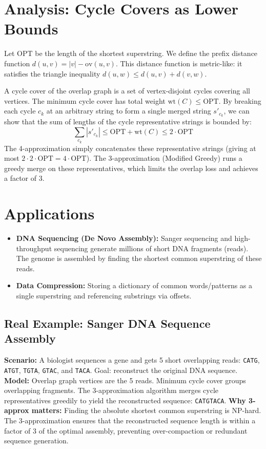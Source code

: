 \documentclass[11pt,oneside]{book}
\begin{document}
\section{Analysis: Cycle Covers as Lower Bounds}
Let $\text{OPT}$ be the length of the shortest superstring. We define the prefix distance function $d(u, v) = |v| - \text{ov}(u, v)$. This distance function is metric-like: it satisfies the triangle inequality $d(u, w) \le d(u, v) + d(v, w)$.

A cycle cover of the overlap graph is a set of vertex-disjoint cycles covering all vertices. The minimum cycle cover has total weight $\text{wt}(C) \le \text{OPT}$. By breaking each cycle $c_k$ at an arbitrary string to form a single merged string $s'_{c_k}$, we can show that the sum of lengths of the cycle representative strings is bounded by:
\[
\sum_{c_k} |s'_{c_k}| \le \text{OPT} + \text{wt}(C) \le 2 \cdot \text{OPT}
\]
The 4-approximation simply concatenates these representative strings (giving at most $2 \cdot 2 \cdot \text{OPT} = 4 \cdot \text{OPT}$). The 3-approximation (Modified Greedy) runs a greedy merge on these representatives, which limits the overlap loss and achieves a factor of 3.

\section{Applications}
\begin{itemize}
    \item \textbf{DNA Sequencing (De Novo Assembly):} Sanger sequencing and high-throughput sequencing generate millions of short DNA fragments (reads). The genome is assembled by finding the shortest common superstring of these reads.
    \item \textbf{Data Compression:} Storing a dictionary of common words/patterns as a single superstring and referencing substrings via offsets.
\end{itemize}

\subsection*{Real Example: Sanger DNA Sequence Assembly}
\textbf{Scenario:} A biologist sequences a gene and gets 5 short overlapping reads: \texttt{CATG}, \texttt{ATGT}, \texttt{TGTA}, \texttt{GTAC}, and \texttt{TACA}. Goal: reconstruct the original DNA sequence.
\textbf{Model:} Overlap graph vertices are the 5 reads. Minimum cycle cover groups overlapping fragments. The 3-approximation algorithm merges cycle representatives greedily to yield the reconstructed sequence: \texttt{CATGTACA}.
\textbf{Why 3-approx matters:} Finding the absolute shortest common superstring is NP-hard. The 3-approximation ensures that the reconstructed sequence length is within a factor of 3 of the optimal assembly, preventing over-compaction or redundant sequence generation.
\end{document}
